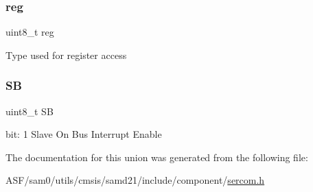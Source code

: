 \subsubsection{\texorpdfstring{reg}{reg}}
{\footnotesize\ttfamily uint8\+\_\+t reg}

Type used for register access \mbox{\label{union_s_e_r_c_o_m___i2_c_m___i_n_t_e_n_s_e_t___type_af6e25191020f32790ed358bdb7152678}} 
\subsubsection{\texorpdfstring{SB}{SB}}
{\footnotesize\ttfamily uint8\+\_\+t SB}

bit\+: 1 Slave On Bus Interrupt Enable 

The documentation for this union was generated from the following file\+:\begin{DoxyCompactItemize}
\item 
A\+S\+F/sam0/utils/cmsis/samd21/include/component/\mbox{\hyperlink{utils_2cmsis_2samd21_2include_2component_2sercom_8h}{sercom.\+h}}\end{DoxyCompactItemize}
